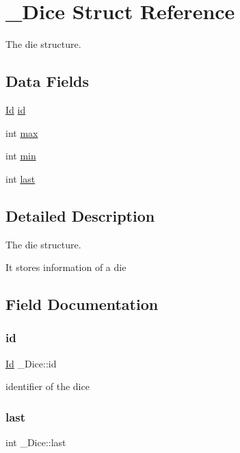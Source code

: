 \hypertarget{struct__Dice}{}\section{\+\_\+\+Dice Struct Reference}
\label{struct__Dice}


The die structure.  


\subsection*{Data Fields}
\begin{DoxyCompactItemize}
\item 
\hyperlink{types_8h_a845e604fb28f7e3d97549da3448149d3}{Id} \hyperlink{struct__Dice_ac5dba09cfd201b4a4a69d483111878e5}{id}
\item 
int \hyperlink{struct__Dice_a2895744914ba9458e96cb7c043c5c1ef}{max}
\item 
int \hyperlink{struct__Dice_a75fd8560afa02172adfe8ac33ca73827}{min}
\item 
int \hyperlink{struct__Dice_a52c35a0a07157a2ce112b9fc99b162c3}{last}
\end{DoxyCompactItemize}


\subsection{Detailed Description}
The die structure. 

It stores information of a die 

\subsection{Field Documentation}
\mbox{\label{struct__Dice_ac5dba09cfd201b4a4a69d483111878e5}} 
\subsubsection{\texorpdfstring{id}{id}}
{\footnotesize\ttfamily \hyperlink{types_8h_a845e604fb28f7e3d97549da3448149d3}{Id} \+\_\+\+Dice\+::id}

identifier of the dice \mbox{\label{struct__Dice_a52c35a0a07157a2ce112b9fc99b162c3}} 
\subsubsection{\texorpdfstring{last}{last}}
{\footnotesize\ttfamily int \+\_\+\+Dice\+::last}

